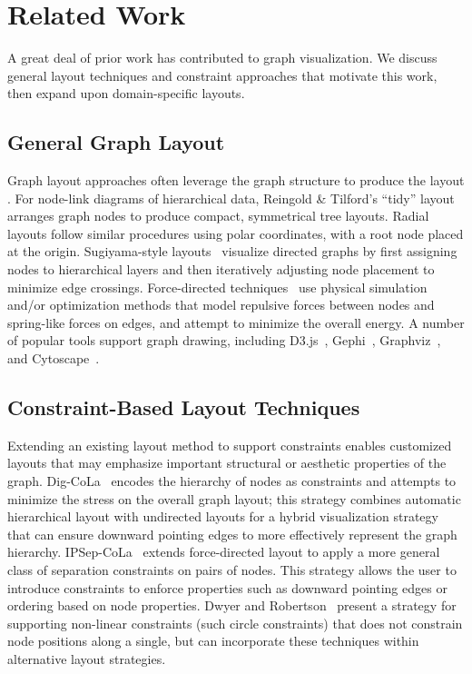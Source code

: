 \section{Related Work}

A great deal of prior work has contributed to graph visualization.
We discuss general layout techniques and constraint approaches
that motivate this work, then expand upon domain-specific layouts.

\subsection{General Graph Layout}
Graph layout approaches often leverage the graph structure to produce the 
layout \cite{herman2000graph,eades2010graph,gibson2013survey}.
For node-link diagrams of hierarchical data, Reingold \& Tilford's ``tidy'' 
layout~\cite{reingold1981tidier} arranges graph nodes to
produce compact, symmetrical tree layouts.
Radial layouts \cite{battista1998graph,herman2000graph} follow similar procedures using polar 
coordinates, with a root node placed at the origin.
Sugiyama-style layouts~\cite{sugiyama1981methods} visualize directed graphs by first assigning nodes to hierarchical layers and then iteratively adjusting node placement to minimize edge crossings.
Force-directed techniques~\cite{tutte1963draw,kobourov2012spring,quinn1979forced,fruchterman1991graph} 
use physical simulation and/or optimization methods that model repulsive forces between nodes and spring-like forces on edges, and attempt to minimize the overall energy. 
A number of popular tools support graph drawing, including D3.js~\cite{bostock:d3}, Gephi~\cite{bastian2009gephi},
Graphviz~\cite{ellson2001graphviz}, and Cytoscape~\cite{shannon2003cytoscape}.

\subsection{Constraint-Based Layout Techniques}
Extending an existing layout method to support constraints enables
customized layouts that may emphasize important
structural or aesthetic properties of the graph. 
Dig-CoLa~\cite{dwyer2005dig} encodes the hierarchy of nodes as constraints
and attempts to minimize the stress on the overall graph layout; this strategy
combines automatic hierarchical layout with undirected layouts for a hybrid
visualization strategy that can ensure downward pointing edges to more
effectively represent the graph hierarchy. \mbox{IPSep-CoLa~\cite{dwyer2006ipsep}} extends
force-directed layout to apply a more general class of separation constraints 
on pairs of nodes. This strategy allows the user to introduce constraints to enforce properties 
such as downward pointing edges or ordering based on node properties.
Dwyer and Robertson~\cite{dwyer2009layout} present a strategy for supporting 
non-linear constraints (such circle constraints) that does not constrain node
positions along a single, but can incorporate these techniques within
alternative layout strategies.

